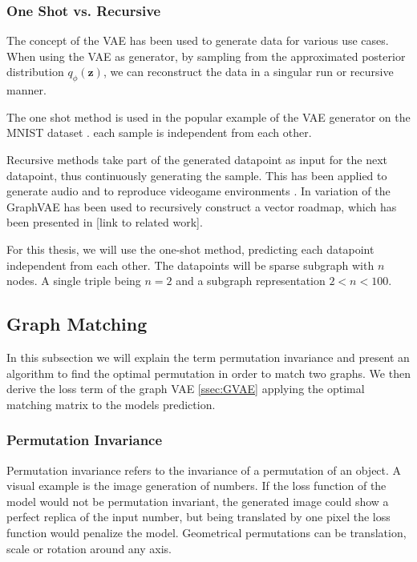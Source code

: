 {\subsubsection{One Shot vs. Recursive}
The concept of the VAE has been used to generate data for various use cases. When using the VAE as generator, by sampling from the approximated posterior distribution $q_{\phi}\left(\mathbf{z}\right)$, we can reconstruct the data in a singular run or recursive manner.

The one shot method is used in the popular example of the VAE generator on the MNIST dataset \cite{kingma_auto-encoding_2014}. each sample is independent from each other.

Recursive methods take part of the generated datapoint as input for the next datapoint, thus continuously generating the sample. This has been applied to generate audio and to reproduce videogame environments \cite{ha_world_2018}. In \cite{belli_image-conditioned_2019} variation of the GraphVAE has been used to recursively construct a vector roadmap, which has been presented in [link to related work].

For this thesis, we will use the one-shot method, predicting each datapoint independent from each other. The datapoints will be sparse subgraph with $n$ nodes. A single triple being $n=2$ and a subgraph representation $2<n<100$. 

\subsection{Graph Matching}
\label{ssec:graphmatch}
In this subsection we will explain the term permutation invariance and present an algorithm to find the optimal permutation in order to match two graphs. We then derive the loss term of the graph VAE \ref{ssec:GVAE} applying the optimal matching matrix to the models prediction.

\subsubsection{Permutation Invariance}


Permutation invariance refers to the invariance of a permutation of an object. A visual example is the image generation of numbers. If the loss function of the model would not be permutation invariant, the generated image could show a perfect replica of the input number, but being translated by one pixel the loss function would penalize the model. Geometrical permutations can be translation, scale or rotation around any axis. 

}
